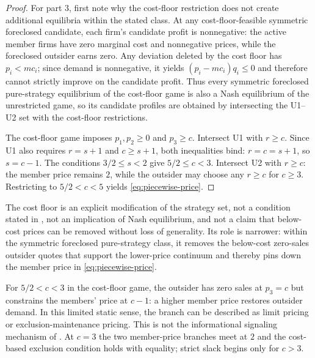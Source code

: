 \begin{proof}
For part 3, first note why the cost-floor restriction does not create additional equilibria within the stated class. At any cost-floor-feasible symmetric foreclosed candidate, each firm's candidate profit is nonnegative: the active member firms have zero marginal cost and nonnegative prices, while the foreclosed outsider earns zero. Any deviation deleted by the cost floor has $p_i<mc_i$; since demand is nonnegative, it yields $(p_i-mc_i)q_i\leq0$ and therefore cannot strictly improve on the candidate profit. Thus every symmetric foreclosed pure-strategy equilibrium of the cost-floor game is also a Nash equilibrium of the unrestricted game, so its candidate profiles are obtained by intersecting the U1--U2 set with the cost-floor restrictions.

The cost-floor game imposes $p_1,p_2\geq0$ and $p_3\geq c$. Intersect U1 with $r\geq c$. Since U1 also requires $r=s+1$ and $c\geq s+1$, both inequalities bind: $r=c=s+1$, so $s=c-1$. The conditions $3/2\leq s<2$ give $5/2\leq c<3$. Intersect U2 with $r\geq c$: the member price remains $2$, while the outsider may choose any $r\geq c$ for $c\geq3$. Restricting to $5/2<c<5$ yields \eqref{eq:piecewise-price}.
\end{proof}

The cost floor is an explicit modification of the strategy set, not a condition stated in \citet{gandalshy2001}, not an implication of Nash equilibrium, and not a claim that below-cost prices can be removed without loss of generality. Its role is narrower: within the symmetric foreclosed pure-strategy class, it removes the below-cost zero-sales outsider quotes that support the lower-price continuum and thereby pins down the member price in \eqref{eq:piecewise-price}.

For $5/2<c<3$ in the cost-floor game, the outsider has zero sales at $p_3=c$ but constrains the members' price at $c-1$: a higher member price restores outsider demand. In this limited static sense, the branch can be described as limit pricing or exclusion-maintenance pricing. This is not the informational signaling mechanism of \citet{milgromroberts1982}. At $c=3$ the two member-price branches meet at $2$ and the cost-based exclusion condition holds with equality; strict slack begins only for $c>3$.
